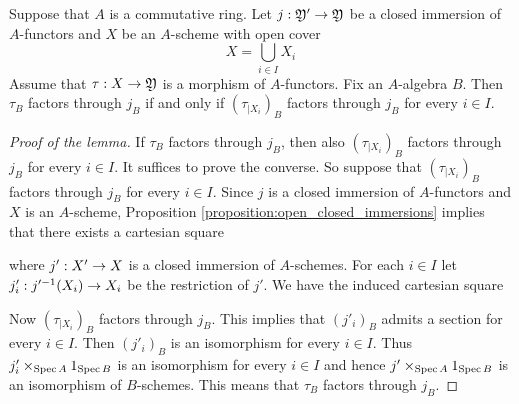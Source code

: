 \begin{lemma}\label{lemma:covers_and_factorizations}
Suppose that $A$ is a commutative ring. Let $j:{\mathfrak Y}'\rightarrow {\mathfrak Y}$ be a closed immersion of $A$-functors and $X$ be an $A$-scheme with open cover
$$X=\bigcup_{i\in I}X_i$$
Assume that $\tau:X\rightarrow {\mathfrak Y}$ is a morphism of $A$-functors. Fix an $A$-algebra $B$. Then $\tau_B$ factors through $j_B$ if and only if $\left(\tau_{\mid X_i}\right)_B$ factors through $j_B$ for every $i\in I$.
\end{lemma}
\begin{proof}[Proof of the lemma]
If $\tau_B$ factors through $j_B$, then also $\left(\tau_{\mid X_i}\right)_B$ factors through $j_B$ for every $i\in I$. It suffices to prove the converse. So suppose that $\left(\tau_{\mid X_i}\right)_B$ factors through $j_B$ for every $i\in I$. Since $j$ is a closed immersion of $A$-functors and $X$ is an $A$-scheme, Proposition \ref{proposition:open_closed_immersions} implies that there exists a cartesian square
\begin{center}
\end{center}
where $j':X'\rightarrow X$ is a closed immersion of $A$-schemes. For each $i\in I$ let $j'_i:j'^{-1}(X_i)\rightarrow X_i$ be the restriction of $j'$. We have the induced cartesian square
\begin{center}
\end{center}
Now $\left(\tau_{\mid X_i}\right)_B$ factors through $j_B$. This implies that $(j'_i)_B$ admits a section for every $i\in I$. Then $(j'_i)_B$ is an isomorphism for every $i\in I$. Thus $j'_i\times_{\mathrm{Spec}\, A}1_{\mathrm{Spec}\, B}$ is an isomorphism for every $i\in I$ and hence $j'\times_{\mathrm{Spec}\, A}1_{\mathrm{Spec}\, B}$ is an isomorphism of $B$-schemes. This means that $\tau_B$ factors through $j_B$.
\end{proof}

